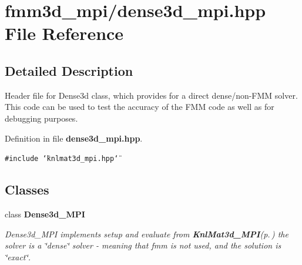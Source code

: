\section{fmm3d\_\-mpi/dense3d\_\-mpi.hpp File Reference}
\label{dense3d__mpi_8hpp}


\subsection{Detailed Description}
Header file for Dense3d class, which provides for a direct dense/non-FMM solver. This code can be used to test the accuracy of the FMM code as well as for debugging purposes. 

Definition in file {\bf dense3d\_\-mpi.hpp}.

{\tt \#include \char`\"{}knlmat3d\_\-mpi.hpp\char`\"{}}\par
\subsection*{Classes}
\begin{CompactItemize}
\item 
class {\bf Dense3d\_\-MPI}
\begin{CompactList}\small\item\em Dense3d\_\-MPI implements setup and evaluate from {\bf Knl\-Mat3d\_\-MPI}{\rm (p.\,\pageref{classKnlMat3d__MPI})} the solver is a \char`\"{}dense\char`\"{} solver - meaning that fmm is not used, and the solution is \char`\"{}exact\char`\"{}. \item\end{CompactList}\end{CompactItemize}
